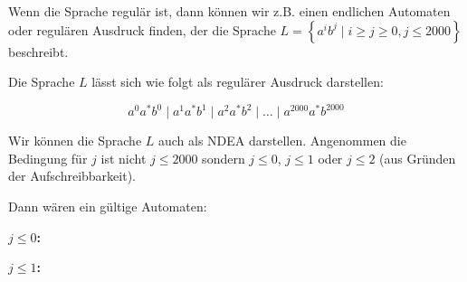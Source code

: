 \documentclass{article}
\begin{document}
      Wenn die Sprache regul\"ar ist, dann k\"onnen wir z.B. einen endlichen
      Automaten oder regul\"aren Ausdruck finden, der die Sprache $L =
      \left\{a^ib^j \mid i \geq j \geq 0, j \leq 2000 \right\}$ beschreibt.

      Die Sprache $L$ l\"asst sich wie folgt als regul\"arer Ausdruck
      darstellen:

      \begin{equation*}
         a^0a^*b^0 \mid a^1a^*b^1 \mid a^2a^*b^2 \mid \ldots \mid a^{2000}a^*b^{2000}
      \end{equation*}

      Wir k\"onnen die Sprache $L$ auch als NDEA darstellen. Angenommen
      die Bedingung f\"ur $j$ ist nicht $j \leq 2000$ sondern $j \leq 0$, $j\leq
      1$ oder $j \leq 2$ (aus Gr\"unden der Aufschreibbarkeit).

      Dann w\"aren ein g\"ultige Automaten:

      \textbf{$j \leq 0$:}

      \begin{center}
      \end{center}

      \textbf{$j \leq 1$:}

      \begin{center}
      \end{center}
\end{document}
